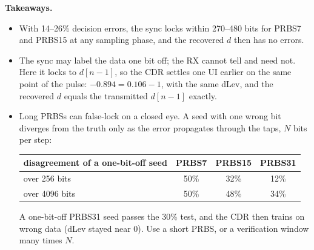 \documentclass[10pt]{article}
\begin{document}
\noindent\textbf{Takeaways.}
\begin{itemize}\itemsep0pt
  \item With 14--26\% decision errors, the sync locks within 270--480 bits for PRBS7 and PRBS15 at
        any sampling phase, and the recovered $d$ then has no errors.
  \item The sync may label the data one bit off; the RX cannot tell and need not. Here it locks to
        $d[n-1]$, so the CDR settles one UI earlier on the same point of the pulse: $-0.894 =
        0.106 - 1$, with the same dLev, and the recovered $d$ equals the transmitted $d[n-1]$ exactly.
  \item Long PRBSs can false-lock on a closed eye. A seed with one wrong bit diverges from the truth
        only as the error propagates through the taps, $N$ bits per step:
        \begin{center}\small
        \begin{tabular}{lccc}
        \toprule
        disagreement of a one-bit-off seed & PRBS7 & PRBS15 & PRBS31 \\
        \midrule
        over 256 bits & 50\% & 32\% & 12\% \\
        over 4096 bits & 50\% & 48\% & 34\% \\
        \bottomrule
        \end{tabular}
        \end{center}
        A one-bit-off PRBS31 seed passes the 30\% test, and the CDR then trains on wrong data
        (dLev stayed near 0). Use a short PRBS, or a verification window many times $N$.
\end{itemize}
\end{document}
